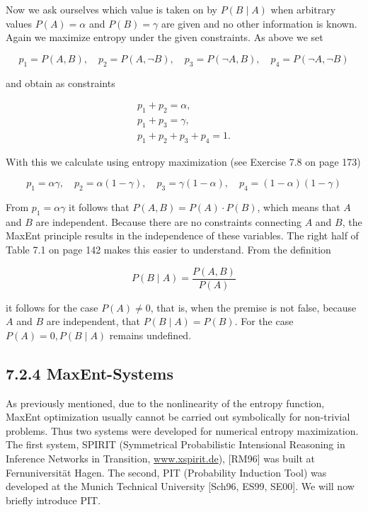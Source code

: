 \documentclass[10pt]{book}
\begin{document}
\begin{center}
\begin{enumerate}
Now we ask ourselves which value is taken on by $P(B \mid A)$ when arbitrary values $P(A)=\alpha$ and $P(B)=\gamma$ are given and no other information is known. Again we maximize entropy under the given constraints. As above we set

$$
p_{1}=P(A, B), \quad p_{2}=P(A, \neg B), \quad p_{3}=P(\neg A, B), \quad p_{4}=P(\neg A, \neg B)
$$

and obtain as constraints


\begin{gather*}
p_{1}+p_{2}=\alpha,  \tag{7.10}\\
p_{1}+p_{3}=\gamma,  \tag{7.11}\\
p_{1}+p_{2}+p_{3}+p_{4}=1 . \tag{7.12}
\end{gather*}


With this we calculate using entropy maximization (see Exercise 7.8 on page 173)

$$
p_{1}=\alpha \gamma, \quad p_{2}=\alpha(1-\gamma), \quad p_{3}=\gamma(1-\alpha), \quad p_{4}=(1-\alpha)(1-\gamma)
$$

From $p_{1}=\alpha \gamma$ it follows that $P(A, B)=P(A) \cdot P(B)$, which means that $A$ and $B$ are independent. Because there are no constraints connecting $A$ and $B$, the MaxEnt principle results in the independence of these variables. The right half of Table 7.1 on page 142 makes this easier to understand. From the definition

$$
P(B \mid A)=\frac{P(A, B)}{P(A)}
$$

it follows for the case $P(A) \neq 0$, that is, when the premise is not false, because $A$ and $B$ are independent, that $P(B \mid A)=P(B)$. For the case $P(A)=0, P(B \mid A)$ remains undefined.

\subsection*{7.2.4 MaxEnt-Systems}
As previously mentioned, due to the nonlinearity of the entropy function, MaxEnt optimization usually cannot be carried out symbolically for non-trivial problems. Thus two systems were developed for numerical entropy maximization. The first system, SPIRIT (Symmetrical Probabilistic Intensional Reasoning in Inference Networks in Transition, \href{http://www.xspirit.de}{www.xspirit.de}), [RM96] was built at Fernuniversität Hagen. The second, PIT (Probability Induction Tool) was developed at the Munich Technical University [Sch96, ES99, SE00]. We will now briefly introduce PIT.


\end{enumerate}
\end{center}
\end{document}
